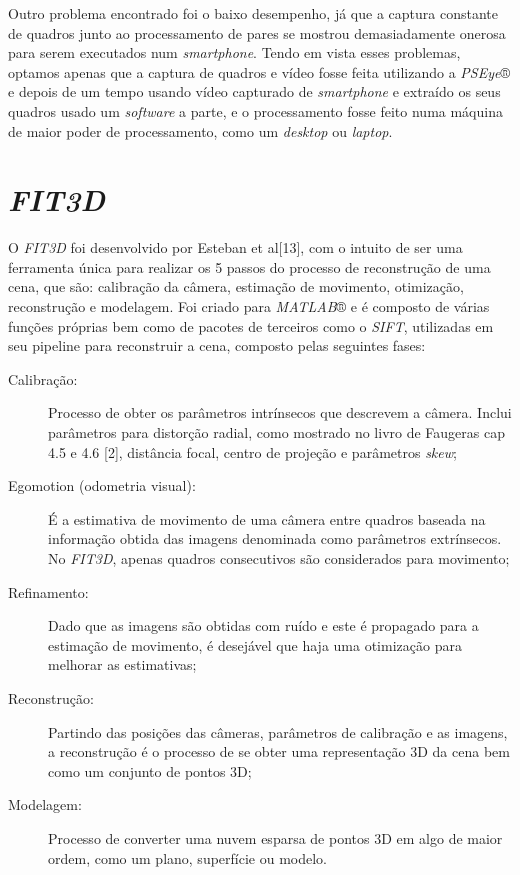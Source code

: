 Outro problema encontrado foi o baixo desempenho, já que a captura constante de quadros junto ao processamento de pares se mostrou demasiadamente onerosa para serem executados num \textit{smartphone}. Tendo em vista esses problemas, optamos  apenas que a captura de quadros e vídeo fosse feita utilizando a \textit{PSEye}® e depois de um tempo usando vídeo capturado de \textit{smartphone} e extraído os seus quadros usado um \textit{software} a parte, e o processamento fosse feito numa máquina de maior poder de processamento, como um \textit{desktop} ou \textit{laptop}.

\section{\textit{FIT3D}}
O \textit{FIT3D} foi desenvolvido por Esteban et al[13], com o intuito de ser uma ferramenta única para realizar os 5 passos do processo de reconstrução de uma cena, que são: calibração da câmera, estimação de movimento, otimização, reconstrução e modelagem. Foi criado para \textit{MATLAB}® e é composto de várias funções próprias bem como de pacotes de terceiros como o \textit{SIFT}, utilizadas em seu pipeline para reconstruir a cena, composto pelas seguintes fases:
\begin{description}
	\item[Calibração: ]{Processo de obter os parâmetros intrínsecos que descrevem a câmera. Inclui parâmetros para distorção radial, como mostrado no livro de Faugeras cap 4.5 e 4.6 [2], distância focal, centro de projeção e parâmetros \textit{skew};}
	\item[Egomotion (odometria visual): ]{É a estimativa de movimento de uma câmera entre quadros baseada na informação obtida das imagens denominada como parâmetros extrínsecos. No \textit{FIT3D}, apenas quadros consecutivos são considerados para movimento;}
	\item[Refinamento: ]{Dado que as imagens são obtidas com ruído e este é propagado para a estimação de movimento, é desejável que haja uma otimização para melhorar as estimativas;}
	\item[Reconstrução: ]{Partindo das posições das câmeras, parâmetros de calibração e as imagens, a reconstrução é o processo de se obter uma representação 3D da cena bem como um conjunto de pontos 3D;}
	\item[Modelagem: ]{Processo de converter uma nuvem esparsa de pontos 3D em algo de maior ordem, como um plano, superfície ou modelo.}
\end{description}

